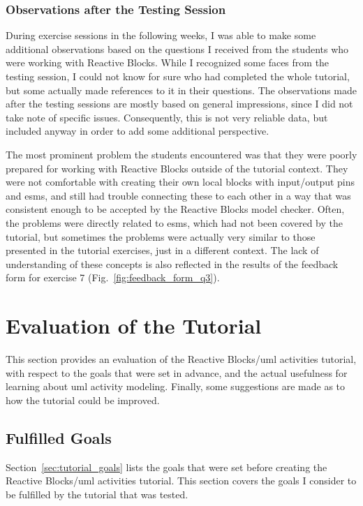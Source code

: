 \subsubsection{Observations after the Testing Session}
During exercise sessions in the following weeks, I was able to make some additional observations based on the questions I received from the students who were working with Reactive Blocks. While I recognized some faces from the testing session, I could not know for sure who had completed the whole tutorial, but some actually made references to it in their questions. The observations made after the testing sessions are mostly based on general impressions, since I did not take note of specific issues. Consequently, this is not very reliable data, but included anyway in order to add some additional perspective.

\noindent
The most prominent problem the students encountered was that they were poorly prepared for working with Reactive Blocks outside of the tutorial context. They were not comfortable with creating their own local blocks with input/output pins and \glspl{esm}, and still had trouble connecting these to each other in a way that was consistent enough to be accepted by the Reactive Blocks model checker. Often, the problems were directly related to \glspl{esm}, which had not been covered by the tutorial, but sometimes the problems were actually very similar to those presented in the tutorial exercises, just in a different context. The lack of understanding of these concepts is also reflected in the results of the feedback form for exercise 7 (Fig.~\ref{fig:feedback_form_q3}).

\clearpage

\section{Evaluation of the Tutorial}
\label{sec:tutorial_evaluation}
This section provides an evaluation of the Reactive Blocks/\gls{uml} activities tutorial, with respect to the goals that were set in advance, and the actual usefulness for learning about \gls{uml} activity modeling. Finally, some suggestions are made as to how the tutorial could be improved.

\subsection{Fulfilled Goals}
\label{sec:tutorial_goals_fulfilled}
Section~\ref{sec:tutorial_goals} lists the goals that were set before creating the Reactive Blocks/\gls{uml} activities tutorial. This section covers the goals I consider to be fulfilled by the tutorial that was tested.

